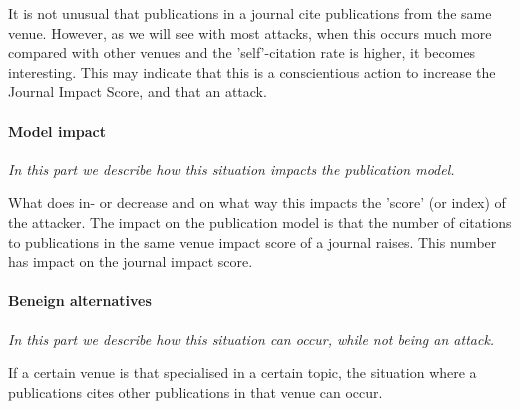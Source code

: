 \documentclass{ou-report}
\newcommand{\outline}[1]{{\color{blue} #1}}
\begin{document}
It is not unusual that 
publications in a journal cite publications from the same venue. However, as we 
will see with most attacks, when this occurs much more 
compared with other venues and the 'self'-citation rate is higher, it becomes 
interesting. This may indicate that this is a conscientious action to increase
the Journal Impact Score, and that an attack.

\paragraph{Model impact}
\textit{In this part we describe how this situation impacts the publication 
model.}

What does in- or decrease and on what way this impacts the 'score' (or index) 
of the attacker.
The impact on the publication model is that the number of citations to 
publications in the same venue impact score of a journal raises. This number has
impact on the journal impact score.

\paragraph{Beneign alternatives}
\textit{In this part we describe how this situation can occur, while not being
an attack.} 

If a certain venue is that specialised in a certain topic, the 
situation where a publications cites other publications in that venue can occur.







\end{document}
